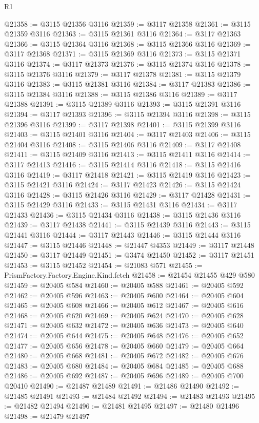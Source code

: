 \begin{lexlean}{R1}
\begin{coremodule}
@21358 := @3115 @21356 @3116
@21359 := @3117 @21358
@21361 := @3115 @21359 @3116
@21363 := @3115 @21361 @3116
@21364 := @3117 @21363
@21366 := @3115 @21364 @3116
@21368 := @3115 @21366 @3116
@21369 := @3117 @21368
@21371 := @3115 @21369 @3116
@21373 := @3115 @21371 @3116
@21374 := @3117 @21373
@21376 := @3115 @21374 @3116
@21378 := @3115 @21376 @3116
@21379 := @3117 @21378
@21381 := @3115 @21379 @3116
@21383 := @3115 @21381 @3116
@21384 := @3117 @21383
@21386 := @3115 @21384 @3116
@21388 := @3115 @21386 @3116
@21389 := @3117 @21388
@21391 := @3115 @21389 @3116
@21393 := @3115 @21391 @3116
@21394 := @3117 @21393
@21396 := @3115 @21394 @3116
@21398 := @3115 @21396 @3116
@21399 := @3117 @21398
@21401 := @3115 @21399 @3116
@21403 := @3115 @21401 @3116
@21404 := @3117 @21403
@21406 := @3115 @21404 @3116
@21408 := @3115 @21406 @3116
@21409 := @3117 @21408
@21411 := @3115 @21409 @3116
@21413 := @3115 @21411 @3116
@21414 := @3117 @21413
@21416 := @3115 @21414 @3116
@21418 := @3115 @21416 @3116
@21419 := @3117 @21418
@21421 := @3115 @21419 @3116
@21423 := @3115 @21421 @3116
@21424 := @3117 @21423
@21426 := @3115 @21424 @3116
@21428 := @3115 @21426 @3116
@21429 := @3117 @21428
@21431 := @3115 @21429 @3116
@21433 := @3115 @21431 @3116
@21434 := @3117 @21433
@21436 := @3115 @21434 @3116
@21438 := @3115 @21436 @3116
@21439 := @3117 @21438
@21441 := @3115 @21439 @3116
@21443 := @3115 @21441 @3116
@21444 := @3117 @21443
@21446 := @3115 @21444 @3116
@21447 := @3115 @21446
@21448 := @21447 @4353
@21449 := @3117 @21448
@21450 := @3117 @21449
@21451 := @3474 @21450
@21452 := @3117 @21451
@21453 := @3115 @21452
@21454 := @21083 @571
@21455 := PrismFactory.Factory.Engine.Kind.fetch
@21458 := @21454 @21455 @429 @580
@21459 := @20405 @584
@21460 := @20405 @588
@21461 := @20405 @592
@21462 := @20405 @596
@21463 := @20405 @600
@21464 := @20405 @604
@21465 := @20405 @608
@21466 := @20405 @612
@21467 := @20405 @616
@21468 := @20405 @620
@21469 := @20405 @624
@21470 := @20405 @628
@21471 := @20405 @632
@21472 := @20405 @636
@21473 := @20405 @640
@21474 := @20405 @644
@21475 := @20405 @648
@21476 := @20405 @652
@21477 := @20405 @656
@21478 := @20405 @660
@21479 := @20405 @664
@21480 := @20405 @668
@21481 := @20405 @672
@21482 := @20405 @676
@21483 := @20405 @680
@21484 := @20405 @684
@21485 := @20405 @688
@21486 := @20405 @692
@21487 := @20405 @696
@21489 := @20405 @700 @20410
@21490 := @21487 @21489
@21491 := @21486 @21490
@21492 := @21485 @21491
@21493 := @21484 @21492
@21494 := @21483 @21493
@21495 := @21482 @21494
@21496 := @21481 @21495
@21497 := @21480 @21496
@21498 := @21479 @21497

\end{coremodule}
\end{lexlean}
